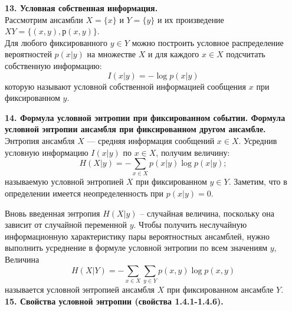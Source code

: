 \documentclass[14pt]{article}
\begin{document}
\bigskip
\textbf{13. Условная собственная информация.} \\

Рассмотрим ансамбли \(X=\{x\}\) и \(Y=\{y\}\) и их произведение \(XY = \{(x, y), р(x,y)\}\). \\
Для любого фиксированного \(y \in Y\) можно построить условное распределение вероятностей \( p(x|y)\) на множестве \(X\) и для каждого \( x \in X \) подсчитать собственную информацию: \\
\begin{displaymath}
    I(x|y) = -\log p(x|y)
\end{displaymath}
которую называют условной собственной информацией сообщения \(x\) при фиксированном \(y\).

\bigskip
\textbf{14. Формула условной энтропии при фиксированном событии. Формула условной энтропии ансамбля при фиксированном другом ансамбле.} \\

Энтропия ансамбля \(X\) — средняя информация сообщений \(x \in X\). Усреднив условную информацию \(I(x|y)\) по \(x \in X\), получим величину:
\begin{displaymath}
    H(X|y) = -\displaystyle\sum_{x \in X} p(x|y)\log p(x|y);
\end{displaymath}
называемую условной энтропией \(X\) при фиксированном \(y \in Y\). Заметим, что в определении имеется неопределенность при \( p(x|y) = 0 \).

Вновь введенная энтропия \(H(X|y)\) -- случайная величина, поскольку она зависит от случайной переменной \(y\). Чтобы получить неслучайную информационную характеристику пары вероятностных ансамблей, нужно выполнить усреднение в формуле условной энтропии по всем значениям \(y\), Величина
\begin{displaymath}
    H(X|Y) = -\displaystyle\sum_{x \in X} \displaystyle\sum_{y \in Y} p(x,y) \log p(x,y)
\end{displaymath}
называется условной энтропией ансамбля \(X\) при фиксированном ансамбле \(Y\). \\

\bigskip
\textbf{15. Свойства условной энтропии (свойства 1.4.1-1.4.6).} \\
\end{document}

